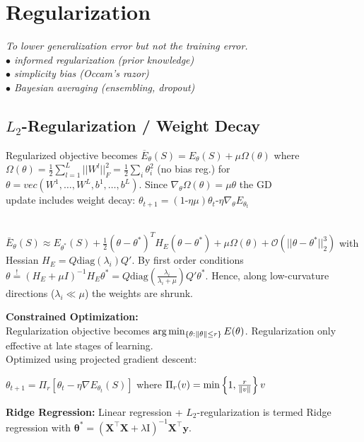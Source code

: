 \section*{Regularization}
\color{black}
\textit{To lower generalization error but not the training error.\\
$\bullet$ informed regularization (prior knowledge)\\
$\bullet$ simplicity bias (Occam's razor)\\
$\bullet$ Bayesian averaging (ensembling, dropout)
}
\subsection*{$L_2$-Regularization / Weight Decay}

Regularized objective becomes 
$\overline{E}_\theta(S)=E_\theta(S)+\mu\Omega(\theta)$
where $\Omega(\theta) = \frac{1}{2} \sum_{l=1}^L ||W^l||_F^2 = \frac{1}{2} \sum_i \theta_i^2$ (no bias reg.) for $\theta = vec(W^1, \ldots, W^L, b^1, \ldots, b^L)$. Since $\nabla_\theta \Omega(\theta) =\mu\theta$ the GD\\ update includes weight decay: $\theta_{t+1} \!=\! (1\text{-}\eta \mu) \theta_t \text{-} \eta \nabla_\theta E_{\theta_t}$

\\
$\bar E_\theta(S) \approx E_{\theta^*}(S)+\frac{1}{2}(\theta-\theta^*)^TH_E(\theta-\theta^*) + \mu \Omega(\theta) + \mathcal{O}(||\theta - \theta^*||_2^3)$ with Hessian $H_E=Q\text{diag}(\lambda_i)Q'$. By first order conditions\\ $\theta\overset{!}{=}(H_E+\mu I)^{-1}H_E\theta^*=Q\text{diag}(\frac{\lambda_i}{\lambda_i+\mu})Q'\theta^*$. Hence, along low-curvature directions ($\lambda_i \ll \mu$) the weights are shrunk.

\textbf{Constrained Optimization:}\\
Regularization objective becomes $\arg\min_{\{\theta:\norm{\theta}\leq r\}}E(\theta)$. Regularization only effective at late stages of learning.\\
Optimized using projected gradient descent:

\hspace{4pt} $\theta_{t+1}=\Pi_r[\theta_t-\eta\nabla E_{\theta_t}(S)]$ where $\Pi_r(v)=\min\left\{1,\frac{r}{\norm{v}}\right\}v$

\textbf{Ridge Regression: }Linear regression + $L_2$-regularization is termed Ridge regression with $\pmb\theta^* = (\mathbf{X}^{\intercal}\mathbf{X}+\lambda\mathrm{I})^{-1}\mathbf{X}^{\intercal}\mathbf{y}$.

